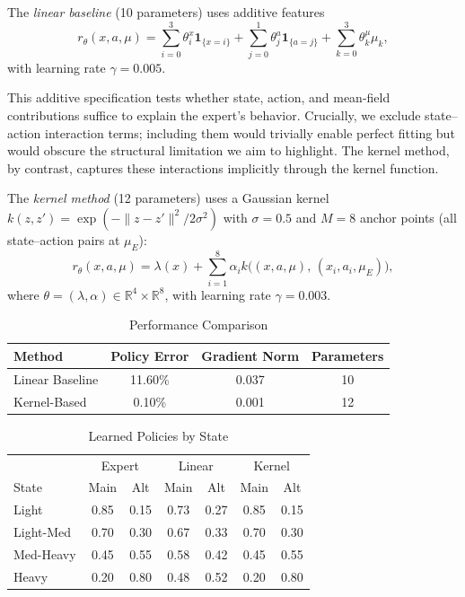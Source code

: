 \documentclass[11pt]{article}
\begin{document}
The \emph{linear baseline} (10 parameters) uses additive features
\begin{equation*}
r_\theta(x,a,\mu) = \sum_{i=0}^{3} \theta^x_i \mathbf{1}_{\{x=i\}}
+ \sum_{j=0}^{1} \theta^a_j \mathbf{1}_{\{a=j\}}
+ \sum_{k=0}^{3} \theta^\mu_k \mu_k,
\end{equation*}
with learning rate $\gamma = 0.005$. 

This additive specification tests whether state, action, and mean-field contributions suffice to explain the expert's behavior. Crucially, we exclude state--action interaction terms; including them would trivially enable perfect fitting but would obscure the structural limitation we aim to highlight. The kernel method, by contrast, captures these interactions implicitly through the kernel function.


The \emph{kernel method} (12 parameters) uses a Gaussian kernel $k(z,z') = \exp(-\|z-z'\|^2 / 2\sigma^2)$ with $\sigma = 0.5$ and $M = 8$ anchor points (all state--action pairs at $\mu_E$):
\begin{equation*}
r_\theta(x,a,\mu) = \lambda(x) + \sum_{i=1}^{8} \alpha_i k\big((x,a,\mu),\, (x_i, a_i, \mu_E)\big),
\end{equation*}
where $\theta = (\lambda, \alpha) \in \mathbb{R}^{4} \times \mathbb{R}^{8}$, with learning rate $\gamma = 0.003$.

\begin{table}[t]
\centering
\caption{Performance Comparison}
\label{tab:comparison}
\begin{tabular}{lccc}
\toprule
Method & Policy Error & Gradient Norm & Parameters \\
\midrule
Linear Baseline & 11.60\% & 0.037 & 10 \\
Kernel-Based & 0.10\% & 0.001 & 12 \\
\bottomrule
\end{tabular}
\end{table}

\begin{table}[t]
\centering
\caption{Learned Policies by State}
\label{tab:policies}
\begin{tabular}{lcccccc}
\toprule
& \multicolumn{2}{c}{Expert} & \multicolumn{2}{c}{Linear} & \multicolumn{2}{c}{Kernel} \\
State & Main & Alt & Main & Alt & Main & Alt \\
\midrule
Light & 0.85 & 0.15 & 0.73 & 0.27 & 0.85 & 0.15 \\
Light-Med & 0.70 & 0.30 & 0.67 & 0.33 & 0.70 & 0.30 \\
Med-Heavy & 0.45 & 0.55 & 0.58 & 0.42 & 0.45 & 0.55 \\
Heavy & 0.20 & 0.80 & 0.48 & 0.52 & 0.20 & 0.80 \\
\bottomrule
\end{tabular}
\end{table}
\end{document}

